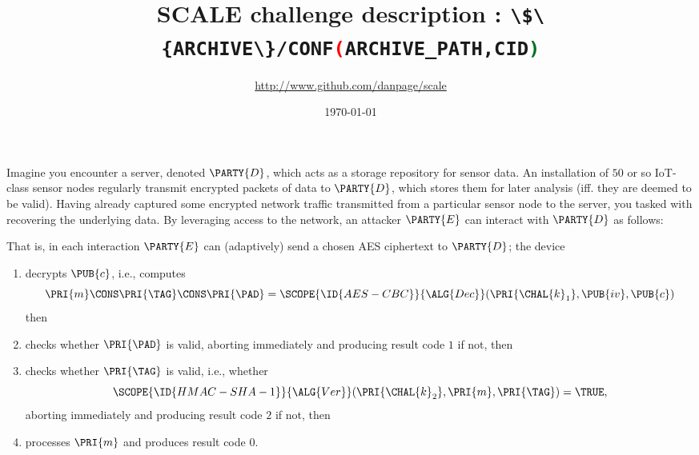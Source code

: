 \documentclass[crop={false},multi={true},tikz={true}]{standalone}
\begin{document}

\ifstandalone
\author{\url{http://www.github.com/danpage/scale}}
\title{\Large SCALE challenge description : \lstinline[language={bash}]|\$\{ARCHIVE\}/CONF(ARCHIVE_PATH,CID)|}
\date{\today}

\maketitle
\fi



Imagine you encounter a server, denoted $\PARTY{D}$, 
which acts as a storage repository for sensor data.  An installation of $50$ 
or so IoT-class sensor nodes regularly transmit encrypted packets of data to
$\PARTY{D}$, which stores them for later analysis (iff. they are deemed to be
valid).  Having already captured some encrypted network traffic transmitted 
from a particular sensor node to the server, you tasked with recovering the 
underlying data.
By leveraging access to the network, 
an attacker $\PARTY{E}$ can interact with $\PARTY{D}$ as follows:

\begin{center}

\end{center}

\noindent
That is, in each interaction $\PARTY{E}$ can (adaptively) send 
a chosen AES ciphertext
to $\PARTY{D}$; the device

\begin{enumerate}
\item decrypts $\PUB{c}$, i.e., computes
      \[
      \PRI{m} \CONS \PRI{\TAG} \CONS \PRI{\PAD} = \SCOPE{\ID{AES-CBC}}{\ALG{Dec}}( \PRI{\CHAL{k}_1}, \PUB{iv}, \PUB{c} )
      \]
      then
\item checks whether $\PRI{\PAD}$ is valid, 
      aborting immediately  and producing result code $1$ if not,
      then
\item checks whether $\PRI{\TAG}$ is valid, i.e., whether 
      \[
      \SCOPE{\ID{HMAC-SHA-1}}{\ALG{Ver}}( \PRI{\CHAL{k}_2}, \PRI{m}, \PRI{\TAG} ) = \TRUE ,
      \]
      aborting immediately  and producing result code $2$ if not,
      then
\item processes $\PRI{m}$
                            and produces  result code $0$.
\end{enumerate}
\end{document}
